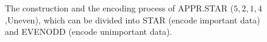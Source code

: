 \documentclass[sigconf]{acmart}
\begin{document}
\begin{figure}[ht]
\centering
{}

\caption{The construction and the encoding process of APPR.STAR ($5,2,1,4$,Uneven), which can be divided into STAR (encode important data) and EVENODD (encode unimportant data).}
\label{fig-ap-5214}
\end{figure}
\end{document}
